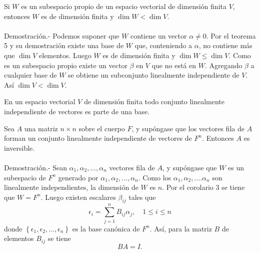 \begin{cor}
    Si $W$ es un subespacio propio de un espacio vectorial de dimensión finita $V$, entonces $W$ es de dimensión finita y $\dim W<\dim V$.\\\\
	Demostración.-\; Podemos suponer que $W$ contiene un vector $\alpha\neq 0$. Por el teorema 5 y su demostración existe una base de $W$ que, conteniendo a $\alpha$, no contiene más que $\dim V$ elementos. Luego $W$ es de dimensión finita y $\dim W\leq \dim V$. Como es un subespacio propio existe un vector $\beta$ en $V$ que no está en $W$. Agregando $\beta$ a cualquier base de $W$ se obtiene un subconjunto linealmente independiente de $V$. Así $\dim V < \dim V$.
\end{cor}

\begin{cor}
    En un espacio vectorial $V$ de dimensión finita todo conjunto linealmente independiente de vectores es parte de una base.
\end{cor}

\begin{cor}
    Sea $A$ una matriz $n\times n$ sobre el cuerpo $F$, y supóngase que los vectores fila de $A$ forman un conjunto linealmente independiente de vectores de $F^n$. Entonces $A$ es inversible.\\\\
	Demostración.-\; Sean $\alpha_1,\alpha_2,\ldots,\alpha_n$ vectores fila de $A$, y supóngase que $W$ es un subespacio de $F^n$ generado por $\alpha_1,\alpha_2,\ldots,\alpha_n$. Como los $\alpha_1,\alpha_2,\ldots.\alpha_n$ son linealmente independientes, la dimensión de $W$ es $n$. Por el corolario 3 se tiene que $W=F^n$. Luego existen escalares $\beta_{ij}$ tales que
	$$\epsilon_i=\sum_{j=1}^n B_{ij}\alpha_j, \quad 1\leq i \leq n$$
	donde $\left\{\epsilon_1,\epsilon_2,\ldots,\epsilon_n\right\}$ es la base canónica de $F^n$. Así, para la matriz $B$ de elementos $B_{ij}$ se tiene 
	$$BA=I.$$
\end{cor}

